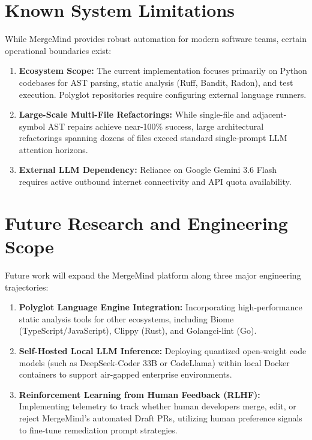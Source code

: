 \documentclass[12pt,a4paper,oneside]{report}
\begin{document}
\section{Known System Limitations}
\label{sec:limitations}

While MergeMind provides robust automation for modern software teams, certain operational boundaries exist:
\begin{enumerate}
    \item \textbf{Ecosystem Scope:} The current implementation focuses primarily on Python codebases for AST parsing, static analysis (Ruff, Bandit, Radon), and test execution. Polyglot repositories require configuring external language runners.
    \item \textbf{Large-Scale Multi-File Refactorings:} While single-file and adjacent-symbol AST repairs achieve near-100\% success, large architectural refactorings spanning dozens of files exceed standard single-prompt LLM attention horizons.
    \item \textbf{External LLM Dependency:} Reliance on Google Gemini 3.6 Flash requires active outbound internet connectivity and API quota availability.
\end{enumerate}

\section{Future Research and Engineering Scope}
\label{sec:future-scope}

Future work will expand the MergeMind platform along three major engineering trajectories:
\begin{enumerate}
    \item \textbf{Polyglot Language Engine Integration:} Incorporating high-performance static analysis tools for other ecosystems, including Biome (TypeScript/JavaScript), Clippy (Rust), and Golangci-lint (Go).
    \item \textbf{Self-Hosted Local LLM Inference:} Deploying quantized open-weight code models (such as DeepSeek-Coder 33B or CodeLlama) within local Docker containers to support air-gapped enterprise environments.
    \item \textbf{Reinforcement Learning from Human Feedback (RLHF):} Implementing telemetry to track whether human developers merge, edit, or reject MergeMind's automated Draft PRs, utilizing human preference signals to fine-tune remediation prompt strategies.
\end{enumerate}
\end{document}
